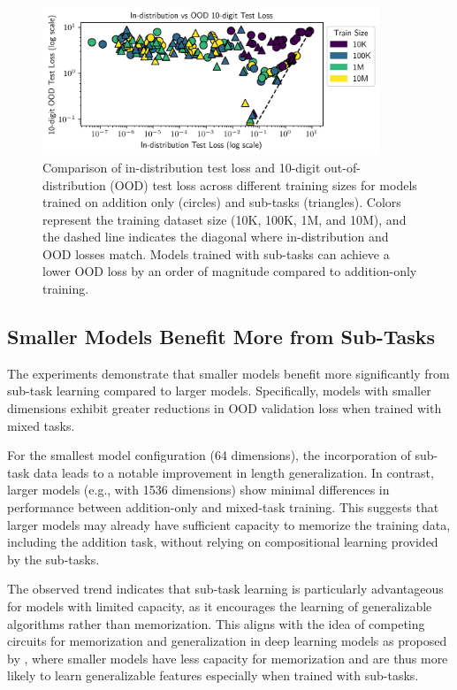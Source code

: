 \begin{figure}[htb!]
    \centering
    \includegraphics[width=0.9\textwidth]{fig/subtask_overfitting.png}
    \caption{Comparison of in-distribution test loss and 10-digit out-of-distribution (OOD) test loss across different training sizes for models trained on addition only (circles) and sub-tasks (triangles). Colors represent the training dataset size (10K, 100K, 1M, and 10M), and the dashed line indicates the diagonal where in-distribution and OOD losses match. Models trained with sub-tasks can achieve a lower OOD loss by an order of magnitude compared to addition-only training.}
    \label{fig:subtask_overfitting}
\end{figure}

\subsection{Smaller Models Benefit More from Sub-Tasks}

The experiments demonstrate that smaller models benefit more significantly from sub-task learning compared to larger models. Specifically, models with smaller dimensions exhibit greater reductions in OOD validation loss when trained with mixed tasks.

For the smallest model configuration (64 dimensions), the incorporation of sub-task data leads to a notable improvement in length generalization. In contrast, larger models (e.g., with 1536 dimensions) show minimal differences in performance between addition-only and mixed-task training. This suggests that larger models may already have sufficient capacity to memorize the training data, including the addition task, without relying on compositional learning provided by the sub-tasks.

The observed trend indicates that sub-task learning is particularly advantageous for models with limited capacity, as it encourages the learning of generalizable algorithms rather than memorization. This aligns with the idea of competing circuits for memorization and generalization in deep learning models as proposed by \cite{varma_explaining_2023}, where smaller models have less capacity for memorization and are thus more likely to learn generalizable features especially when trained with sub-tasks.


